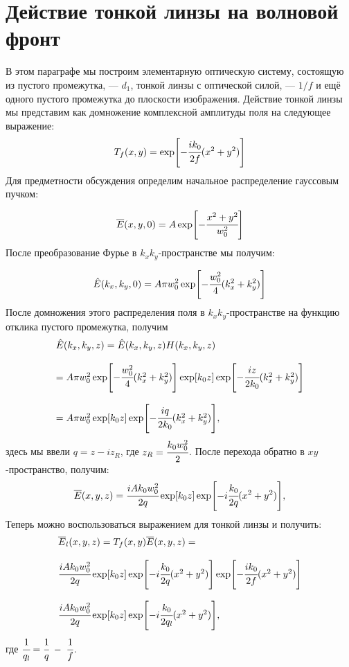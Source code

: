 \section{Действие тонкой линзы на волновой фронт}
В этом параграфе мы построим элементарную оптическую систему, состоящую из пустого промежутка, --- $d_1$, тонкой линзы с оптической силой, --- $1/f$ и ещё одного пустого промежутка до плоскости изображения. Действие тонкой линзы мы представим как домножение комплексной амплитуды поля на следующее выражение: 
\begin{equation}
T_f(x, y) = \exp[-\cfrac{ik_0}{2f}(x^2 + y^2)]
\end{equation}
Для предметности обсуждения определим начальное распределение гауссовым пучком: 

\begin{equation}
\overline{E}(x, y, 0) = A\exp[-\cfrac{x^2 + y^2}{w^2_0}]
\end{equation}
После преобразование Фурье в $k_xk_y$-пространстве мы получим:

\begin{equation}
\hat{E}(k_x, k_y, 0) = A\pi w^2_0\exp[-\cfrac{w^2_0}{4}(k_x^2 + k_y^2)]
\end{equation}
После домножения этого распределения поля в $k_xk_y$-пространстве на функцию отклика пустого промежутка, получим
\begin{equation}
\label{eq:after_lens}
\begin{array}{lcl}
\hat{E}(k_x, k_y, z) = \hat{E}(k_x, k_y, z)H(k_x, k_y, z) 
\\
\\
= A\pi w^2_0\exp[-\cfrac{w^2_0}{4}(k_x^2 + k_y^2)]\exp[k_0z]\exp[-\cfrac{iz}{2k_0}(k^2_x + k^2_y)]
\\
\\
= A\pi w^2_0\exp[k_0z]\exp[-\cfrac{iq}{2k_0}(k^2_x + k^2_y)], 
\end{array}
\end{equation}
здесь мы ввели $q = z - iz_R$, где $z_R = \cfrac{k_0w^2_0}{2}$. После перехода обратно в $xy$-пространство, получим: 
\begin{equation}
\overline{E}(x, y, z) = \cfrac{iAk_0w^2_0}{2q}\exp[k_0z]\exp[-i\cfrac{k_0}{2q}(x^2 + y^2)],
\end{equation}
Теперь можно воспользоваться выражением для тонкой линзы и получить:
\begin{equation}
\begin{array}{lcl}
\overline{E}_{l}(x, y, z) = T_f(x, y)\overline{E}(x, y, z) = 
\\
\\
\cfrac{iAk_0w^2_0}{2q}\exp[k_0z]\exp[-i\cfrac{k_0}{2q}(x^2 + y^2)]\exp[-\cfrac{ik_0}{2f}(x^2 + y^2)]
\\
\\
\cfrac{iAk_0w^2_0}{2q}\exp[k_0z]\exp[-i\cfrac{k_0}{2q_l}(x^2 + y^2)],
\end{array}
\end{equation}
где $\cfrac{1}{q_l} = \cfrac{1}{q} \; - \; \cfrac{1}{f}$. \\


